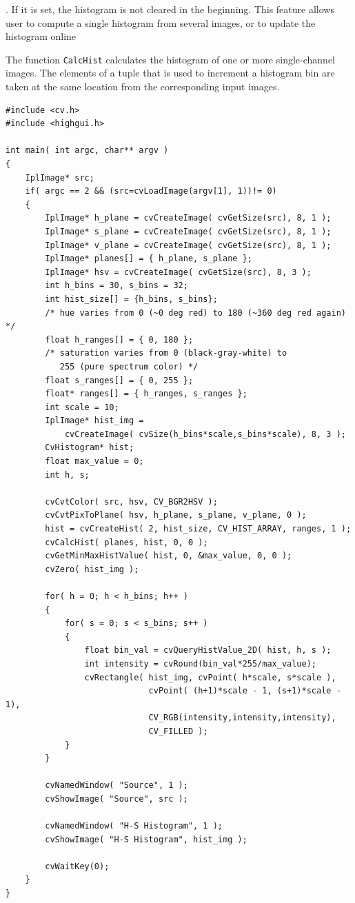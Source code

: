 \begin{description}
. If it is set, the histogram is not cleared in the beginning. This feature allows user to compute a single histogram from several images, or to update the histogram online
\end{description}

The function \texttt{CalcHist} calculates the histogram of one or more
single-channel images. The elements of a tuple that is used to increment
a histogram bin are taken at the same location from the corresponding
input images.

\begin{lstlisting}
#include <cv.h>
#include <highgui.h>

int main( int argc, char** argv )
{
    IplImage* src;
    if( argc == 2 && (src=cvLoadImage(argv[1], 1))!= 0)
    {
        IplImage* h_plane = cvCreateImage( cvGetSize(src), 8, 1 );
        IplImage* s_plane = cvCreateImage( cvGetSize(src), 8, 1 );
        IplImage* v_plane = cvCreateImage( cvGetSize(src), 8, 1 );
        IplImage* planes[] = { h_plane, s_plane };
        IplImage* hsv = cvCreateImage( cvGetSize(src), 8, 3 );
        int h_bins = 30, s_bins = 32;
        int hist_size[] = {h_bins, s_bins};
        /* hue varies from 0 (~0 deg red) to 180 (~360 deg red again) */
        float h_ranges[] = { 0, 180 };
        /* saturation varies from 0 (black-gray-white) to
           255 (pure spectrum color) */
        float s_ranges[] = { 0, 255 };
        float* ranges[] = { h_ranges, s_ranges };
        int scale = 10;
        IplImage* hist_img =
            cvCreateImage( cvSize(h_bins*scale,s_bins*scale), 8, 3 );
        CvHistogram* hist;
        float max_value = 0;
        int h, s;

        cvCvtColor( src, hsv, CV_BGR2HSV );
        cvCvtPixToPlane( hsv, h_plane, s_plane, v_plane, 0 );
        hist = cvCreateHist( 2, hist_size, CV_HIST_ARRAY, ranges, 1 );
        cvCalcHist( planes, hist, 0, 0 );
        cvGetMinMaxHistValue( hist, 0, &max_value, 0, 0 );
        cvZero( hist_img );

        for( h = 0; h < h_bins; h++ )
        {
            for( s = 0; s < s_bins; s++ )
            {
                float bin_val = cvQueryHistValue_2D( hist, h, s );
                int intensity = cvRound(bin_val*255/max_value);
                cvRectangle( hist_img, cvPoint( h*scale, s*scale ),
                             cvPoint( (h+1)*scale - 1, (s+1)*scale - 1),
                             CV_RGB(intensity,intensity,intensity),
                             CV_FILLED );
            }
        }

        cvNamedWindow( "Source", 1 );
        cvShowImage( "Source", src );

        cvNamedWindow( "H-S Histogram", 1 );
        cvShowImage( "H-S Histogram", hist_img );

        cvWaitKey(0);
    }
}
\end{lstlisting}

